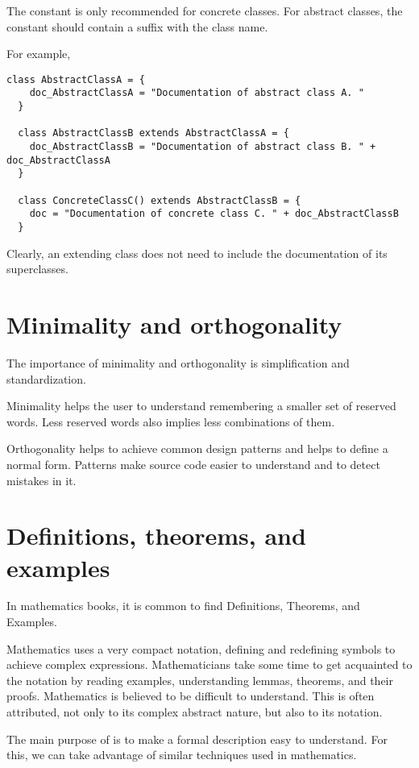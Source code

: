The  constant is only recommended for concrete classes.
For abstract classes, the constant should contain a suffix with the class name.

For example,
\begin{lstlisting}[label={lst:exampleAbstractAndConcreteClassesWithComment}]
  class AbstractClassA = {
    doc_AbstractClassA = "Documentation of abstract class A. "
  }

  class AbstractClassB extends AbstractClassA = {
    doc_AbstractClassB = "Documentation of abstract class B. " + doc_AbstractClassA
  }

  class ConcreteClassC() extends AbstractClassB = {
    doc = "Documentation of concrete class C. " + doc_AbstractClassB
  }
\end{lstlisting}

Clearly, an extending class does not need to include the documentation of its superclasses.


\section{Minimality and orthogonality}

The importance of minimality and orthogonality is simplification and standardization.

Minimality helps the user to understand remembering a smaller set of reserved words.
Less reserved words also implies less combinations of them.

Orthogonality helps to achieve common design patterns and helps to define a normal form.
Patterns make source code easier to understand and to detect mistakes in it.


\section{Definitions, theorems, and examples}

In mathematics books, it is common to find Definitions, Theorems, and Examples.

Mathematics uses a very compact notation, defining and redefining symbols to achieve complex expressions.
Mathematicians take some time to get acquainted to the notation by reading examples, understanding lemmas, theorems, and their proofs.
Mathematics is believed to be difficult to understand.
This is often attributed, not only to its complex abstract nature, but also to its notation.

The main purpose of \Soda is to make a formal description easy to understand.
For this, we can take advantage of similar techniques used in mathematics.

